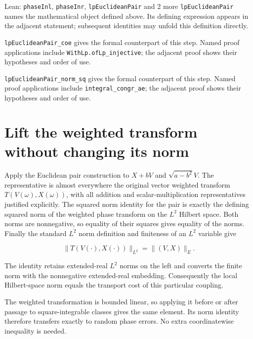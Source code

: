 \documentclass[11pt,a4paper]{article}
\begin{document}
\begin{leanbox}{Lean: \texttt{phaseInl}, \texttt{phaseInr}, \texttt{lpEuclideanPair} and 2 more}
\texttt{lp\allowbreak{}Euclidean\allowbreak{}Pair} names the mathematical object defined above. Its defining expression appears in the adjacent statement; subsequent identities may unfold this definition directly.




\texttt{lp\allowbreak{}Euclidean\allowbreak{}Pair\_\allowbreak{}coe} gives the formal counterpart of this step. Named proof applications include \texttt{With\allowbreak{}Lp.\allowbreak{}of\allowbreak{}Lp\_\allowbreak{}injective}; the adjacent proof shows their hypotheses and order of use.




\texttt{lp\allowbreak{}Euclidean\allowbreak{}Pair\_\allowbreak{}norm\_\allowbreak{}sq} gives the formal counterpart of this step. Named proof applications include \texttt{integral\_\allowbreak{}congr\_\allowbreak{}ae}; the adjacent proof shows their hypotheses and order of use.
\end{leanbox}

\section{\texorpdfstring{Lift the weighted transform without changing its norm}{Lift the weighted transform without changing its norm}}


Apply the Euclidean pair construction to \(X+bV\) and \(\sqrt{a-b^2}V\). The representative is almost everywhere the original vector weighted transform \(T(V(\omega),X(\omega))\), with all addition and scalar-multiplication representatives justified explicitly. The squared norm identity for the pair is exactly the defining squared norm of the weighted phase transform on the \(L^{2}\) Hilbert space. Both norms are nonnegative, so equality of their squares gives equality of the norms. Finally the standard \(L^{2}\) norm definition and finiteness of an \(L^{2}\) variable give

\[\|T(V(\cdot),X(\cdot))\|_{L^2}=\|(V,X)\|_E.\]

The identity retains extended-real \(L^{2}\) norms on the left and converts the finite norm with the nonnegative extended-real embedding. Consequently the local Hilbert-space norm equals the transport cost of this particular coupling.



The weighted transformation is bounded linear, so applying it before or after passage to square-integrable classes gives the same element. Its norm identity therefore transfers exactly to random phase errors. No extra coordinatewise inequality is needed.
\end{document}
